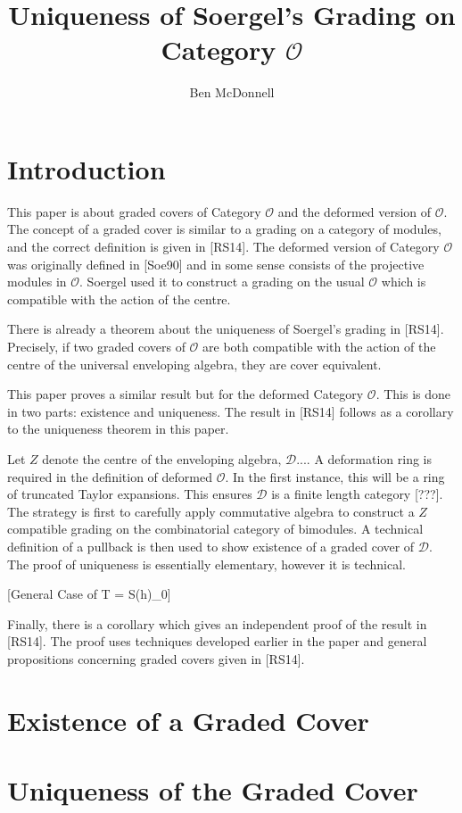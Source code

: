 \documentclass[12pt,amstex,amssymb,amscd]{amsart}
\theoremstyle{remark}
\newcommand{\mc}{\mathcal}
\begin{document}
	\title{Uniqueness of Soergel's Grading on Category $\mc{O}$}
	\author{Ben McDonnell}
	\date{}
	\maketitle
	
	\section{Introduction}
	This paper is about graded covers of Category $\mc{O}$ and the deformed version of $\mc{O}$. The concept of a graded cover is similar to a grading on a category of modules, and the correct definition is given in [RS14]. The deformed version of Category $\mc{O}$ was originally defined in [Soe90] and in some sense consists of the projective modules in $\mc{O}$. Soergel used it to construct a grading on the usual $\mc{O}$ which is compatible with the action of the centre.
	
	There is already a theorem about the uniqueness of Soergel's grading in [RS14]. Precisely, if two graded covers of $\mc{O}$ are both compatible with the action of the centre of the universal enveloping algebra, they are cover equivalent.
	
	This paper proves a similar result but for the deformed Category $\mc{O}$. This is done in two parts: existence and uniqueness. The result in [RS14] follows as a corollary to the uniqueness theorem in this paper.
	
	Let $Z$ denote the centre of the enveloping algebra, $\mc{D}$....
	A deformation ring is required in the definition of deformed $\mc{O}$. In the first instance, this will be a ring of truncated Taylor expansions. This ensures $\mc{D}$ is a finite length category [???]. The strategy is first to carefully apply commutative algebra to construct a $Z$ compatible grading on the combinatorial category of bimodules. A technical definition of a pullback is then used to show existence of a graded cover of $\mc{D}$. The proof of uniqueness is essentially elementary, however it is technical.
	
	[General Case of T = S(h)_0]
	
	Finally, there is a corollary which gives an independent proof of the result in [RS14]. The proof uses techniques developed earlier in the paper and general propositions concerning graded covers given in [RS14].
	\section{Existence of a Graded Cover}
	
	\section{Uniqueness of the Graded Cover}
\end{document}
